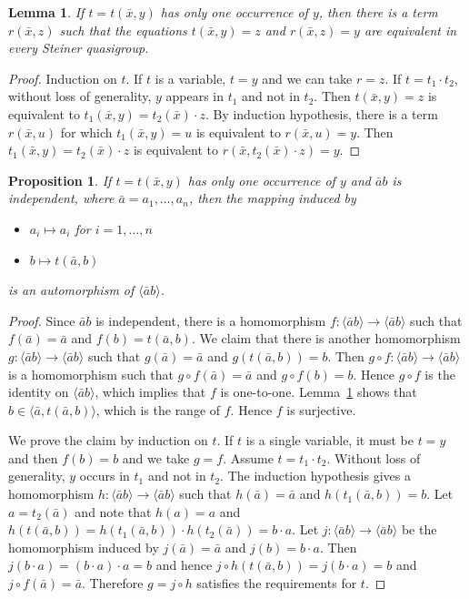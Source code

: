 \documentclass[a4paper, 11pt]{article}
\theoremstyle{note}
\newtheorem{lemma}[thm]{Lemma}
\newtheorem{prop}[thm]{Proposition}
\begin{document}
	\begin{lemma}\label{June9_2} If $t= t(\bar{x},y)$ has only one occurrence of $y$, then there is a term $r(\bar{x},z)$  such that the equations  $t(\bar{x},y)= z$   and   $r(\bar{x},z)= y$  are equivalent in every Steiner quasigroup.
	\end{lemma}
	\begin{proof} Induction on $t$.  If $t$ is a variable, $t= y$  and we can take  $r= z$.  If $t=t_1\cdot t_2$, without loss of generality, $y$ appears in $t_1$ and not in $t_2$. Then $t(\bar{x},y)=z$ is equivalent to  $t_1(\bar{x},y)= t_2(\bar{x})\cdot z$. By induction hypothesis, there is a term $r(\bar{x},u)$  for which  $t_1(\bar{x},y)= u$  is equivalent to  $r(\bar{x},u)= y$.  Then  $t_1(\bar{x},y)= t_2(\bar{x})\cdot z$  is equivalent to  $r(\bar{x},t_2(\bar{x})\cdot z)= y$.
	\end{proof}
	
	\begin{prop}\label{June9_3} If $t= t(\bar{x},y)$ has only one occurrence of $y$ and $\bar{a}b$ is independent, where $\bar{a}=a_1,\ldots,a_n$, then the mapping induced by
		\begin{itemize}
			\item $a_i\mapsto a_i$  for $i=1,\ldots,n$
			\item $b\mapsto t(\bar{a},b)$
		\end{itemize}
		is an automorphism of  $\langle \bar{a}b\rangle$.
	\end{prop}
	\begin{proof} Since $\bar{a}b$ is independent, there is a homomorphism $f:\langle\bar{a}b\rangle\rightarrow \langle\bar{a}b\rangle$  such that  $f(\bar{a}) = \bar{a}$    and  $f(b)= t(\bar{a},b)$.  We claim that there is another homomorphism $g:\langle\bar{a}b\rangle\rightarrow \langle\bar{a}b\rangle$  such that  $g(\bar{a}) = \bar{a}$   and  $g(t(\bar{a},b))= b$. Then  $g\circ f:\langle\bar{a}b\rangle \rightarrow \langle\bar{a}b\rangle$ is a homomorphism  such that  $g\circ f(\bar{a})= \bar{a}$    and $g\circ f(b)=b$. Hence $g\circ f$ is the identity on $\langle\bar{a}b\rangle$, which implies that $f$ is one-to-one. Lemma~\ref{June9_2}  shows that $b\in\langle \bar{a}, t(\bar{a},b)\rangle$, which is the range of $f$. Hence $f$ is surjective.
		
		We prove the claim by induction on $t$.  If  $t$ is a single variable, it must be  $t= y$ and then $f(b)=b$  and we take $g=f$.  Assume $t= t_1\cdot t_2$. Without loss of generality, $y$ occurs in $t_1$ and not in $t_2$.  The induction hypothesis gives a homomorphism $h:\langle\bar{a}b\rangle\rightarrow\langle \bar{a}b\rangle$ such that  $h(\bar{a})= \bar{a}$ and $h(t_1(\bar{a},b))= b$. Let $a= t_2(\bar{a})$ and note that  $h(a)=a$  and $h(t(\bar{a},b))= h(t_1(\bar{a},b))\cdot h(t_2(\bar{a}))= b\cdot a$. Let $j:\langle\bar{a}b\rangle\rightarrow\langle \bar{a}b\rangle$ be the homomorphism induced by  $j(\bar{a})=  \bar{a}$   and $j(b) =b\cdot a$. Then  $j(b\cdot a)= (b\cdot a)\cdot a =b$ and hence  $j\circ h(t(\bar{a},b))= j(b\cdot a) = b$   and  $j\circ f(\bar{a})= \bar{a}$. Therefore $g= j\circ h$ satisfies the requirements for $t$.
	\end{proof}
	
\end{document}
